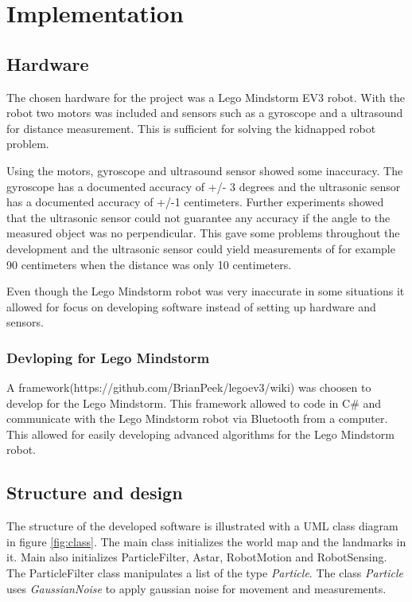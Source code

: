 \chapter{Implementation}
\label{chp:impl}
\section{Hardware}
The chosen hardware for the project was a Lego Mindstorm EV3 robot. With the robot two motors was included and sensors such as a gyroscope and a ultrasound for distance measurement. This is sufficient for solving the kidnapped robot problem.

Using the motors, gyroscope and ultrasound sensor showed some inaccuracy.  The gyroscope has a documented accuracy of +/- 3 degrees and the ultrasonic sensor has a documented accuracy of +/-1 centimeters. Further experiments showed that the ultrasonic sensor could not guarantee any accuracy if the angle to the measured object was no perpendicular. This gave some problems throughout the development and the ultrasonic sensor could yield measurements of for example 90 centimeters when the distance was only 10 centimeters. 

Even though the Lego Mindstorm robot was very inaccurate in some situations it allowed for focus on developing software instead of setting up hardware and sensors. 

\subsection{Devloping for Lego Mindstorm}
A framework(https://github.com/BrianPeek/legoev3/wiki) was choosen to develop for the Lego Mindstorm. This framework allowed to code in C\# and communicate with the Lego Mindstorm robot via Bluetooth from a computer. This allowed for easily developing advanced algorithms for the Lego Mindstorm robot.

\section{Structure and design}
The structure of the developed software is illustrated with a UML class diagram in figure \ref{fig:class}. The main class initializes the world map and the landmarks in it. Main also initializes ParticleFilter, Astar, RobotMotion and RobotSensing. The ParticleFilter class manipulates a list of the type \emph{Particle}. The class \emph{Particle} uses \emph{GaussianNoise} to apply gaussian noise for movement and measurements. 

